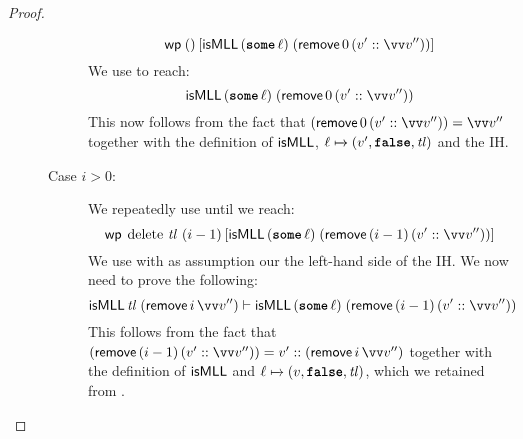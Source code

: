 \documentclass[thesis.tex]{subfiles}
\begin{document}
\begin{proof}
\begin{description}
\begin{description}
                        \[
                            \wpre{()}{\isMLL\, (\Some \loc)\; (\textlog{remove}\, 0\, (\val' :: \vect{\val}''))}
                        \]
                        We use  to reach:
                        \[
                            \isMLL\, (\Some \loc)\; (\textlog{remove}\, 0\, (\val' :: \vect{\val}''))
                        \]
                        This now follows from the fact that $(\textlog{remove}\, 0\, (\val' :: \vect{\val}'')) = \vect{\val}''$ together with the definition of $\textsf{\upshape isMLL}$, $\loc \fmapsto (\val', \False, \tl)$ and the IH.
                  \item[Case $i > 0$:] We repeatedly use  until we reach:
                        \[
                            \wpre{\MLLdelete\,\tl\ (\iindex - 1)}{\isMLL\, (\Some \loc)\; (\textlog{remove}\, (\iindex - 1)\, (\val' :: \vect{\val}''))}
                        \]
                        We use  with as assumption our the left-hand side of the IH. We now need to prove the following:
                        \[\isMLL\, \tl\; (\textlog{remove}\, \iindex\, \vect{\val}'') \proves \isMLL\, (\Some \loc)\; (\textlog{remove}\, (\iindex - 1)\, (\val' :: \vect{\val}''))\]
                        This follows from the fact that $(\textlog{remove}\, (\iindex - 1)\, (\val' :: \vect{\val}'')) = \val' :: (\textlog{remove}\, \iindex\, \vect{\val}'')$ together with the definition of $\textsf{\upshape isMLL}$ and $\loc \fmapsto (\val, \False, \tl)$, which we retained from . \qedhere
              \end{description}
    \end{description}
\end{proof}
\end{document}
